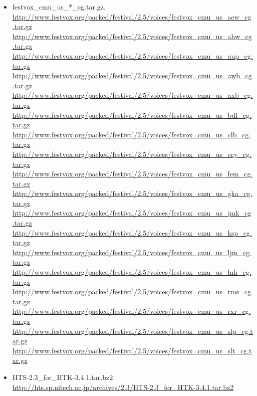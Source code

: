 \documentclass[12pt,]{article}
\begin{document}
\begin{itemize}
		\item festvox\_cmu\_us\_*\_cg.tar.gz. \\
		\url{http://www.festvox.org/packed/festival/2.5/voices/festvox_cmu_us_aew_cg.tar.gz}\\
		\url{http://www.festvox.org/packed/festival/2.5/voices/festvox_cmu_us_ahw_cg.tar.gz}\\
		\url{http://www.festvox.org/packed/festival/2.5/voices/festvox_cmu_us_aup_cg.tar.gz}\\
		\url{http://www.festvox.org/packed/festival/2.5/voices/festvox_cmu_us_awb_cg.tar.gz}\\
		\url{http://www.festvox.org/packed/festival/2.5/voices/festvox_cmu_us_axb_cg.tar.gz}\\
		\url{http://www.festvox.org/packed/festival/2.5/voices/festvox_cmu_us_bdl_cg.tar.gz}\\
		\url{http://www.festvox.org/packed/festival/2.5/voices/festvox_cmu_us_clb_cg.tar.gz}\\
		\url{http://www.festvox.org/packed/festival/2.5/voices/festvox_cmu_us_eey_cg.tar.gz}\\
		\url{http://www.festvox.org/packed/festival/2.5/voices/festvox_cmu_us_fem_cg.tar.gz}\\
		\url{http://www.festvox.org/packed/festival/2.5/voices/festvox_cmu_us_gka_cg.tar.gz}\\
		\url{http://www.festvox.org/packed/festival/2.5/voices/festvox_cmu_us_jmk_cg.tar.gz}\\
		\url{http://www.festvox.org/packed/festival/2.5/voices/festvox_cmu_us_ksp_cg.tar.gz}\\
		\url{http://www.festvox.org/packed/festival/2.5/voices/festvox_cmu_us_ljm_cg.tar.gz}\\
		\url{http://www.festvox.org/packed/festival/2.5/voices/festvox_cmu_us_lnh_cg.tar.gz}\\
		\url{http://www.festvox.org/packed/festival/2.5/voices/festvox_cmu_us_rms_cg.tar.gz}\\
		\url{http://www.festvox.org/packed/festival/2.5/voices/festvox_cmu_us_rxr_cg.tar.gz}\\
		\url{http://www.festvox.org/packed/festival/2.5/voices/festvox_cmu_us_slp_cg.tar.gz}\\
		\url{http://www.festvox.org/packed/festival/2.5/voices/festvox_cmu_us_slt_cg.tar.gz}

		\item HTS-2.3\_for\_HTK-3.4.1.tar.bz2 \\
		\url{http://hts.sp.nitech.ac.jp/archives/2.3/HTS-2.3_for_HTK-3.4.1.tar.bz2}


\end{itemize}
\end{document}
